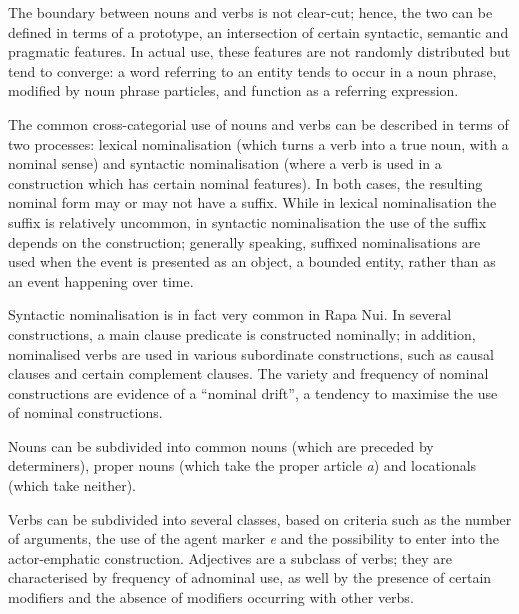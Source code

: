 The boundary between nouns and verbs is not clear-cut; hence, the two can be defined in terms of a prototype, an intersection of certain syntactic, semantic and pragmatic features. In actual use, these features are not randomly distributed but tend to converge: a word referring to an entity tends to occur in a noun phrase, modified by noun phrase particles, and function as a referring expression.

The common cross-categorial use of nouns and verbs can be described in terms of two processes: lexical nominalisation (which turns a verb into a true noun, with a nominal sense) and syntactic nominalisation (where a verb is used in a construction which has certain nominal features). In both cases, the resulting nominal form may or may not have a suffix. While in lexical nominalisation the suffix is relatively uncommon, in syntactic nominalisation the use of the suffix depends on the construction; generally speaking, suffixed nominalisations are used when the event is presented as an object, a bounded entity, rather than as an event happening over time.

Syntactic nominalisation is in fact very common in Rapa Nui. In several constructions, a main clause predicate is constructed nominally; in addition, nominalised verbs are used in various subordinate constructions, such as causal clauses and certain complement clauses. The variety and frequency of nominal constructions are evidence of a “nominal drift”, a tendency to maximise the use of nominal constructions.

Nouns can be subdivided into common nouns (which are preceded by determiners), proper nouns (which take the proper article \textit{a}) and locationals (which take neither). 

Verbs can be subdivided into several classes, based on criteria such as the number of arguments, the use of the agent marker \textit{e} and the possibility to enter into the actor-emphatic construction. Adjectives are a subclass of verbs; they are characterised by frequency of adnominal use, as well by the presence of certain modifiers and the absence of modifiers occurring with other verbs.
